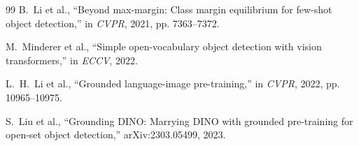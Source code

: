 \documentclass[conference]{IEEEtran}
\begin{document}
\begin{thebibliography}{99}
B.~Li et al., ``Beyond max-margin: Class margin equilibrium for few-shot object detection,'' in \emph{CVPR}, 2021, pp. 7363--7372.

M.~Minderer et al., ``Simple open-vocabulary object detection with vision transformers,'' in \emph{ECCV}, 2022.

L.~H.~Li et al., ``Grounded language-image pre-training,'' in \emph{CVPR}, 2022, pp. 10965--10975.

S.~Liu et al., ``Grounding DINO: Marrying DINO with grounded pre-training for open-set object detection,'' arXiv:2303.05499, 2023.

\end{thebibliography}
\end{document}
